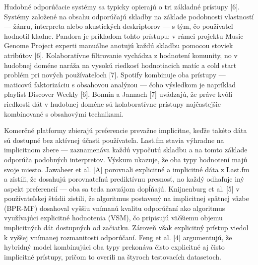 


  
Hudobné odporúčacie systémy sa typicky opierajú o tri základné prístupy [6]. Systémy založené na obsahu odporúčajú skladby na základe podobnosti vlastností — žánru, interpreta alebo akustických deskriptorov — s tým, čo používateľ hodnotil kladne. Pandora je príkladom tohto prístupu: v rámci projektu Music Genome Project experti manuálne anotujú každú skladbu pomocou stoviek atribútov [6]. Kolaboratívne filtrovanie vychádza z hodnotení komunity, no v hudobnej doméne naráža na vysokú riedkosť hodnotiacich matíc a cold start problém pri nových používateľoch [7]. Spotify kombinuje oba prístupy — maticovú faktorizáciu s obsahovou analýzou — čoho výsledkom je napríklad playlist Discover Weekly [6]. Bonnin a Jannach [7] uvádzajú, že práve kvôli riedkosti dát v hudobnej doméne sú kolaboratívne prístupy najčastejšie kombinované s obsahovými technikami.

Komerčné platformy zbierajú preferencie prevažne implicitne, keďže takéto dáta sú dostupné bez aktívnej účasti používateľa. Last.fm stavia výhradne na implicitnom zbere — zaznamenáva každú vypočutú skladbu a na tomto základe odporúča podobných interpretov. Výskum ukazuje, že oba typy hodnotení majú svoje miesto. Jawaheer et al. [A] porovnali explicitné a implicitné dáta z Last.fm a zistili, že dosahujú porovnateľnú prediktívnu presnosť, no každý odhaľuje iný aspekt preferencií — oba sa teda navzájom dopĺňajú. Knijnenburg et al. [5] v používateľskej štúdii zistili, že algoritmus postavený na implicitnej spätnej väzbe (BPR-MF) dosahoval vyššiu vnímanú kvalitu odporúčaní ako algoritmus využívajúci explicitné hodnotenia (VSM), čo pripisujú väčšiemu objemu implicitných dát dostupných od začiatku. Zároveň však explicitný prístup viedol k vyššej vnímanej rozmanitosti odporúčaní. Feng et al. [4] argumentujú, že hybridný model kombinujúci oba typy prekonáva čisto explicitné aj čisto implicitné prístupy, pričom to overili na štyroch testovacích datasetoch.

